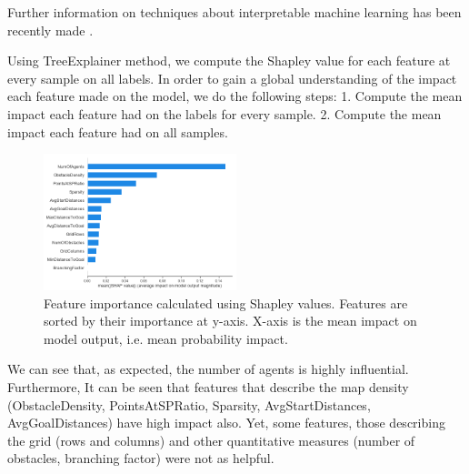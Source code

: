 \documentclass[letterpaper]{article} %
\begin{document}
Further information on techniques about interpretable machine learning has been recently made \cite{du2018techniques}.

Using TreeExplainer method, we compute the Shapley value for each feature at every sample on all labels. In order to gain a global understanding of the impact each feature made on the model, we do the following steps:
1. Compute the mean impact each feature had on the labels for every sample.
2. Compute the mean impact each feature had on all samples.

\begin{figure}[h]
    \centering
    \includegraphics[width=0.5\textwidth]{Charts/mean_all_classes.png}
    \caption{Feature importance calculated using Shapley values. Features are sorted by their importance at y-axis. X-axis is the mean impact on model output, i.e. mean probability impact.}
    \label{fig:FeatureImportance}
\end{figure}

We can see that, as expected, the number of agents is highly influential. 
Furthermore, It can be seen that features that describe the map density (ObstacleDensity, PointsAtSPRatio, Sparsity, AvgStartDistances, AvgGoalDistances) have high impact also. 
Yet, some features, those describing the grid (rows and columns) and other quantitative measures (number of obstacles, branching factor) were not as helpful.

\end{document}
